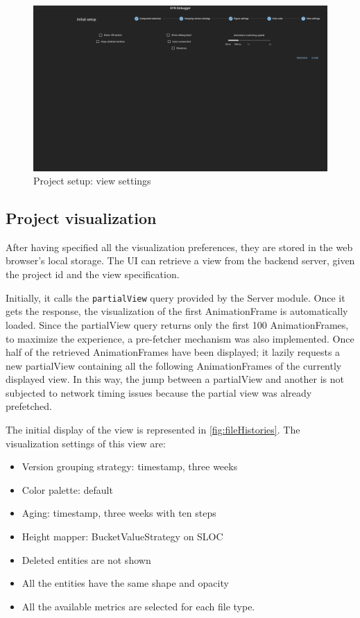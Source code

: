\begin{figure}
    \center
    \includegraphics[width=\textwidth]{SYNUI-settings5.png}
    \caption{Project setup: view settings}
    \label{fig:SYNUIsettings5}
\end{figure}

\subsection*{Project visualization}
After having specified all the visualization preferences, they are stored in the web browser's local storage. 
The UI can retrieve a view from the backend server, given the project id and the view specification. 

Initially, it calls the \texttt{partialView} query provided by the Server module. Once it gets the response, the visualization of the first AnimationFrame is automatically loaded. 
Since the partialView query returns only the first 100 AnimationFrames, to maximize the experience, a pre-fetcher mechanism was also implemented. 
Once half of the retrieved AnimationFrames have been displayed; it lazily requests a new partialView containing all the following AnimationFrames of the currently displayed view. 
In this way, the jump between a partialView and another is not subjected to network timing issues because the partial view was already prefetched. 


The initial display of the view is represented in \autoref{fig:fileHistories}. The visualization settings of this view are:
\begin{itemize}
    \item Version grouping strategy: timestamp, three weeks
    \item Color palette: default
    \item Aging: timestamp, three weeks with ten steps
    \item Height mapper: BucketValueStrategy on SLOC
    \item Deleted entities are not shown
    \item All the entities have the same shape and opacity
    \item All the available metrics are selected for each file type. 
\end{itemize}

